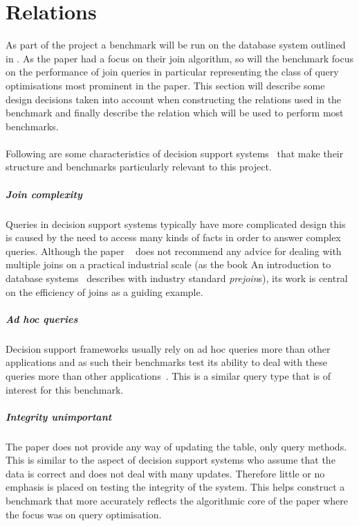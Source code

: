 \section{Relations}
As part of the project a benchmark will be run on the database system outlined
in . As the paper \relalg{} had a focus on their join algorithm, so will the benchmark focus
on the performance of join queries in particular representing the class of query
optimisations most prominent in the paper. This section will describe some design
decisions taken into account when constructing the relations used in the
benchmark and finally describe the  relation which will be
used to perform most benchmarks.

\paragraph{}Following are some characteristics of decision support
systems~\cite{IntroToDatabaseSystems}
that make their structure and benchmarks particularly relevant to this
project.

\subparagraph{Join complexity} Queries in decision support systems typically
have more complicated design this is caused by the need to access many
kinds of facts in order to answer complex queries. Although the
paper \relalg{}~\cite{RelationalAlgebraByWayOfAdjunctions}
does not recommend any advice for dealing with multiple joins on a practical
industrial scale (as the book An introduction to database
systems~\cite{IntroToDatabaseSystems} describes with industry
standard \emph{prejoin}s), its work is central on the efficiency of joins as a
guiding example.

\subparagraph{Ad hoc queries} Decision support frameworks usually rely on ad hoc
queries more than other applications and as such their benchmarks test its
ability to deal with these queries more than other applications~\cite{SetQueryBenchmark, PractitionersIntroduction}. This is a similar
query type that is of interest for this benchmark.

\subparagraph{Integrity unimportant} The paper \relalg{} does not provide any way of
updating the table, only query methods. This is similar to the aspect of
decision support systems who assume that the data is correct and
does not deal with many updates. Therefore little or no emphasis is placed on
testing the integrity of the system. This helps construct a benchmark that more
accurately reflects the algorithmic core of the paper where the focus was on
query optimisation.
